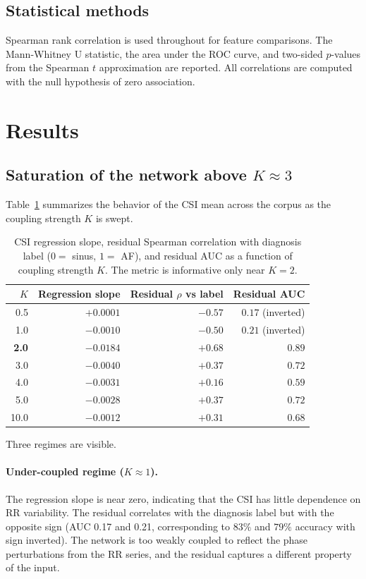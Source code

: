 \documentclass[11pt]{article}
\begin{document}
\subsection{Statistical methods}

Spearman rank correlation is used throughout for feature comparisons.
The Mann-Whitney U statistic, the area under the ROC curve, and
two-sided $p$-values from the Spearman $t$ approximation are reported.
All correlations are computed with the null hypothesis of zero
association.

\section{Results}

\subsection{Saturation of the network above $K \approx 3$}

Table~\ref{tab:ksweep} summarizes the behavior of the CSI mean across
the corpus as the coupling strength $K$ is swept.

\begin{table}[h]
\centering
\begin{tabular}{rrrr}
\toprule
$K$ & Regression slope & Residual $\rho$ vs label & Residual AUC \\
\midrule
0.5 & $+0.0001$ & $-0.57$ & $0.17$ (inverted) \\
1.0 & $-0.0010$ & $-0.50$ & $0.21$ (inverted) \\
\textbf{2.0} & $\mathbf{-0.0184}$ & $\mathbf{+0.68}$ & $\mathbf{0.89}$ \\
3.0 & $-0.0040$ & $+0.37$ & $0.72$ \\
4.0 & $-0.0031$ & $+0.16$ & $0.59$ \\
5.0 & $-0.0028$ & $+0.37$ & $0.72$ \\
10.0 & $-0.0012$ & $+0.31$ & $0.68$ \\
\bottomrule
\end{tabular}
\caption{CSI regression slope, residual Spearman correlation with
diagnosis label ($0 =$ sinus, $1 =$ AF), and residual AUC as a function
of coupling strength $K$. The metric is informative only near $K = 2$.}
\label{tab:ksweep}
\end{table}

Three regimes are visible.

\paragraph{Under-coupled regime ($K \approx 1$).} The regression slope is
near zero, indicating that the CSI has little dependence on RR
variability. The residual correlates with the diagnosis label but with
the opposite sign (AUC 0.17 and 0.21, corresponding to $83\%$ and $79\%$
accuracy with sign inverted). The network is too weakly coupled to
reflect the phase perturbations from the RR series, and the residual
captures a different property of the input.
\end{document}
